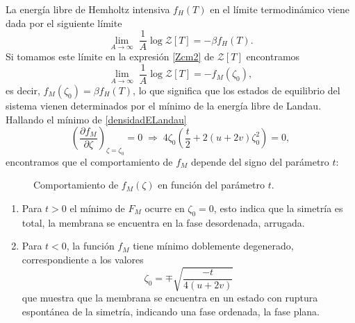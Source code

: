 La energía libre de Hemholtz intensiva $f_H(T)$ en el límite termodinámico
viene dada por el siguiente límite
\begin{equation*}
\lim_{A\rightarrow \infty}\; \frac{1}{A} \log \mathcal{Z}[T]=-\beta f_H(T).
\end{equation*}
Si tomamos este límite en la expresión \eqref{Zcm2} de $\mathcal{Z}[T]$
encontramos
\begin{equation*}
\lim_{A\rightarrow \infty}\; \frac{1}{A} \log \mathcal{Z}[T]=-f_M(\zeta_0),
\end{equation*}
es decir, $f_M(\zeta_0)=\beta f_H(T)$, lo que significa que los estados de
equilibrio del sistema vienen determinados por el mínimo de la energía libre
de Landau. Hallando el mínimo de \eqref{densidadELandau} 
\begin{equation*}
\left(\frac{\partial f_M}{\partial \zeta}\right)_{\!\zeta=\zeta_0}\!=0 \;
\Rightarrow \; 4\zeta_0\left(\frac{t}{2}+2(u+2v)\zeta_0^2\right)=0,
\end{equation*}
encontramos que el comportamiento de $f_M$ depende del signo del parámetro $t$:
\begin{figure}[h]
\centering
 \resizebox{\columnwidth}{!}{}
\caption{Comportamiento de $f_M(\zeta)$ en función del parámetro $t$.}
\end{figure} 

\begin{enumerate}
\item Para $t>0$ el mínimo de $F_M$ ocurre en $\zeta_0=0$, esto indica que la
  simetría es total, la membrana se encuentra en la fase desordenada,
  arrugada.
\item Para $t<0$, la función $f_M$ tiene mínimo doblemente
  degenerado, correspondiente a los valores
  \begin{equation}\label{zeta_0}
    \zeta_0=\mp \sqrt{\frac{-t}{4(u+2v)}}
  \end{equation}
  que muestra que la membrana se encuentra en un estado con ruptura espontánea
  de la simetría, indicando una fase ordenada, la fase plana. 
\end{enumerate}

